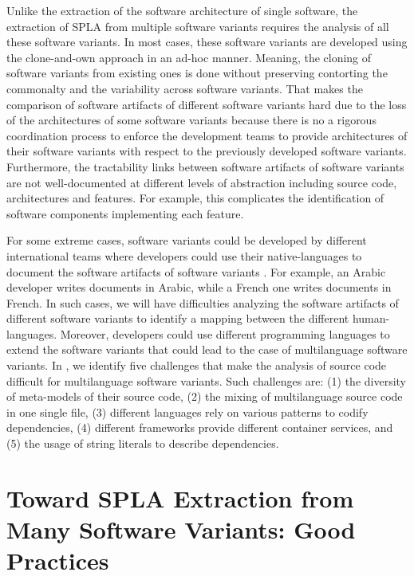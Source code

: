 \documentclass[graybox]{svmult}
\begin{document}
Unlike the extraction of the software architecture of single software, the extraction of SPLA from multiple software variants requires the analysis of all these software variants. In most cases, these software variants are developed using the clone-and-own approach in an ad-hoc manner. Meaning, the cloning of software variants from existing ones is done without preserving contorting the commonalty and the variability across software variants. That makes the comparison of software artifacts of different software variants hard due to the loss of the architectures of some software variants because there is no a rigorous coordination process to enforce the development teams to provide architectures of their software variants with respect to the previously developed software variants. Furthermore, the tractability links between software artifacts of software variants are not well-documented at different levels of abstraction including source code, architectures and features. For example, this complicates the identification of software components implementing each feature.

For some extreme cases, software variants could be developed by different international teams \cite{businge2018clone} where developers could use their native-languages to document the software artifacts of software variants \cite{capiluppi2018national}. For example, an Arabic developer writes documents in Arabic, while a French one writes documents in French. In such cases, we will have difficulties analyzing the software artifacts of different software variants to identify a mapping between the different human-languages. 
Moreover, developers could use different programming languages to extend the software variants that could lead to the case of multilanguage software variants. In \cite{shatnawi2017analyzing}, we identify five challenges that make the analysis of source code difficult for multilanguage software variants. Such challenges are: (1) the diversity of meta-models of their source code, (2) the mixing of multilanguage source code in one single file, (3) different languages rely on various patterns to codify dependencies, (4) different frameworks provide different container services, and (5) the usage of string literals to describe dependencies.


\section{Toward SPLA Extraction from Many Software Variants: Good Practices}
\label{sec:extraction-spla}
\end{document}
